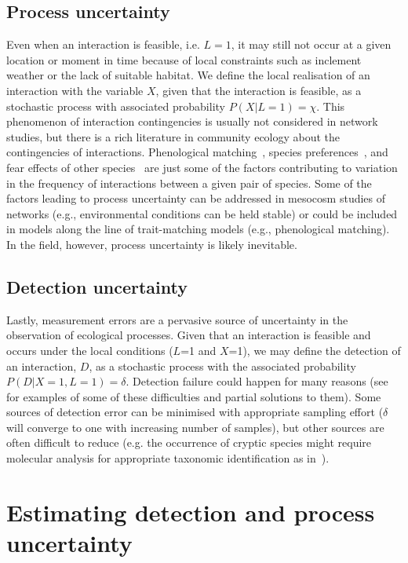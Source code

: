 \documentclass[12pt]{article}
\begin{document}
\begin{spacing}{2.0}
    \subsection*{Process uncertainty} 

     Even when an interaction is feasible, i.e. $L=1$, it may still not occur at a given location or moment in time because of local constraints such as inclement weather or the lack of suitable habitat. We define the local realisation of an interaction with the variable $X$, given that the interaction is feasible, as a stochastic process with associated probability $P(X|L=1)=\chi$. This phenomenon of interaction contingencies is usually not considered in network studies, but there is a rich literature in community ecology about the contingencies of interactions. Phenological matching~\citep{MillerRushing2010,Gezon2016}, species preferences~\citep{Pires2011,Novak2015,Coux2016}, and fear effects of other species~\citep{Luttbeg2005,Wirsing2008} are just some of the factors contributing to variation in the frequency of interactions between a given pair of species. Some of the factors leading to process uncertainty can be addressed in mesocosm studies of networks (e.g., environmental conditions can be held stable) or could be included in models along the line of trait-matching models (e.g., phenological matching). In the field, however, process uncertainty is likely inevitable.


    \subsection*{Detection uncertainty} 

      Lastly, measurement errors are a pervasive source of uncertainty in the observation of ecological processes. Given that an interaction is feasible and occurs under the local conditions ($L$=1 and $X$=1), we may define the detection of an interaction, $D$, as a stochastic process with the associated probability $P(D|X=1,L=1)=\delta$. Detection failure could happen for many reasons (see~\citet{Wirta2014} for examples of some of these difficulties and partial solutions to them). Some sources of detection error can be minimised with appropriate sampling effort ($\delta$ will converge to one with increasing number of samples), but other sources are often difficult to reduce (e.g. the occurrence of cryptic species might require molecular analysis for appropriate taxonomic identification as in~\citealt{Wirta2014,Frost2016}). 


\section*{Estimating detection and process uncertainty}


\end{spacing}
\end{document}

